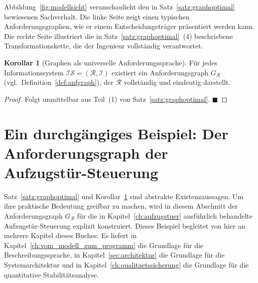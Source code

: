 ﻿\documentclass[a4paper,12pt]{report}
\theoremstyle{definition}
\newtheorem{korollar}{Korollar}[section]
\begin{document}
Abbildung~\ref{fig:modellsicht} veranschaulicht den in Satz~\ref{satz:graphoptimal}
bewiesenen Sachverhalt. Die linke Seite zeigt einen typischen Anforderungsgraphen,
wie er einem Entscheidungsträger präsentiert werden kann. Die rechte Seite
illustriert die in Satz~\ref{satz:graphoptimal}~(4) beschriebene Transformationskette,
die der Ingenieur vollständig verantwortet.

\begin{korollar}[Graphen als universelle Anforderungssprache]
\label{kor:graphuniv}
Für jedes Informationssystem $\mathcal{IS} = (\mathcal{R}, \mathcal{I})$ existiert ein
Anforderungsgraph $G_\mathcal{R}$ (vgl.\ Definition~\ref{def:anfgraph}), der
$\mathcal{R}$ vollständig und eindeutig darstellt.
\end{korollar}

\begin{proof}
Folgt unmittelbar aus Teil~(1) von Satz~\ref{satz:graphoptimal}. $\blacksquare$
\end{proof}


\section{Ein durchgängiges Beispiel: Der Anforderungsgraph der Aufzugstür-Steuerung}
\label{sec:grobdesign-beispiel}

Satz~\ref{satz:graphoptimal} und Korollar~\ref{kor:graphuniv} sind abstrakte
Existenzaussagen. Um ihre praktische Bedeutung greifbar zu machen, wird in
diesem Abschnitt der Anforderungsgraph $G_{\mathcal{R}}$ für die in
Kapitel~\ref{ch:aufzugstuer} ausführlich behandelte Aufzugstür-Steuerung
explizit konstruiert. Dieses Beispiel begleitet von hier an mehrere Kapitel
dieses Buches: Es liefert in Kapitel~\ref{ch:vom_modell_zum_programm} die
Grundlage für die Beschreibungssprache, in
Kapitel~\ref{sec:architektur} die Grundlage für die Systemarchitektur und in
Kapitel~\ref{ch:qualitaetssicherung} die Grundlage für die quantitative
Stabilitätsanalyse.
\end{document}
